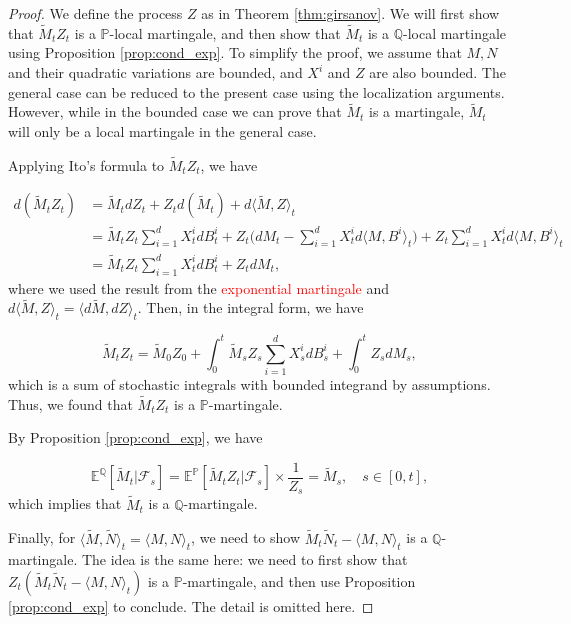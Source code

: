 \documentclass{article}
\begin{document}
\begin{proof}
We define the process $Z$ as in Theorem \ref{thm:girsanov}. We will first show that $\tilde{M}_tZ_t$ is a $\mathbb{P}$-local martingale, and then show that $\tilde{M}_t$ is a $\mathbb{Q}$-local martingale using Proposition \ref{prop:cond_exp}. To simplify the proof, we assume that $M,N$ and their quadratic variations are bounded, and $X^i$ and $Z$ are also bounded. The general case can be reduced to the present case using the localization arguments. However, while in the bounded case we can prove that $\tilde{M}_t$ is a martingale, $\tilde{M}_t$ will only be a local martingale in the general case.

Applying Ito's formula to $\tilde{M}_tZ_t$, we have

\begin{equation}
\begin{aligned}
d(\tilde{M}_tZ_t)&=\tilde{M}_tdZ_t+Z_td(\tilde{M}_t)+d\langle \tilde{M},Z\rangle_t\\
&=\tilde{M}_tZ_t\sum^d_{i=1}X^i_tdB_t^i+Z_t\Big(dM_t-\sum^d_{i=1}X_t^id\langle M,B^i\rangle_t\Big)+Z_t\sum^d_{i=1}X_t^id\langle M,B^i\rangle_t\\
&=\tilde{M}_tZ_t\sum^d_{i=1}X^i_tdB_t^i+Z_tdM_t,
\end{aligned}
\end{equation}
where we used the result from the \textcolor{red}{exponential martingale} and $d\langle \tilde{M},Z\rangle_t=\langle d\tilde{M},dZ\rangle_t$. Then, in the integral form, we have

\begin{equation}
\tilde{M}_tZ_t=\tilde{M}_0Z_0+\int^t_0\tilde{M}_sZ_s\sum^d_{i=1}X^i_sdB_s^i+\int^t_0Z_sdM_s,
\end{equation}
which is a sum of stochastic integrals with bounded integrand by assumptions. Thus, we found that $\tilde{M}_tZ_t$ is a $\mathbb{P}$-martingale. 

By Proposition \ref{prop:cond_exp}, we have 

\begin{equation}
\mathbb{E}^\mathbb{Q}[\tilde{M}_t|\mathcal{F}_s]=\mathbb{E}^\mathbb{P}[\tilde{M}_tZ_t|\mathcal{F}_s]\times\frac{1}{Z_s}=\tilde{M}_s, \quad s\in[0,t],
\end{equation}
which implies that $\tilde{M}_t$ is a $\mathbb{Q}$-martingale.

Finally, for $\langle\tilde{M},\tilde{N}\rangle_t=\langle M,N\rangle_t$, we need to show $\tilde{M}_t\tilde{N}_t-\langle M,N\rangle_t$ is a $\mathbb{Q}$-martingale. The idea is the same here: we need to first show that $Z_t(\tilde{M}_t\tilde{N}_t-\langle M,N\rangle_t)$ is a $\mathbb{P}$-martingale, and then use Proposition \ref{prop:cond_exp} to conclude. The detail is omitted here.
\end{proof}
\end{document}
